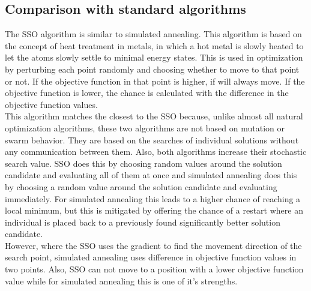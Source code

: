 \documentclass[runningheads]{llncs}
\begin{document}
\subsection{Comparison with standard algorithms}
The SSO algorithm is similar to simulated annealing. This algorithm is based on the concept of heat treatment in metals, in which a hot metal is slowly heated to let the atoms slowly settle to minimal energy states. This is used in optimization by perturbing each point randomly and choosing whether to move to that point or not. If the objective function in that point is higher, if will always move. If the objective function is lower, the chance is calculated with the difference in the objective function values.\\
This algorithm matches the closest to the SSO because, unlike almost all natural optimization algorithms, these two algorithms are not based on mutation or swarm behavior. They are based on the searches of individual solutions without any communication between them. Also, both algorithms increase their stochastic search value. SSO does this by choosing random values around the solution candidate and evaluating all of them at once and simulated annealing does this by choosing a random value around the solution candidate and evaluating immediately. For simulated annealing this leads to a higher chance of reaching a local minimum, but this is mitigated by offering the chance of a restart where an individual is placed back to a previously found significantly better solution candidate.\\
However, where the SSO uses the gradient to find the movement direction of the search point, simulated annealing uses difference in objective function values in two points. Also, SSO can not move to a position with a lower objective function value while for simulated annealing this is one of it's strengths.\\


\end{document}
